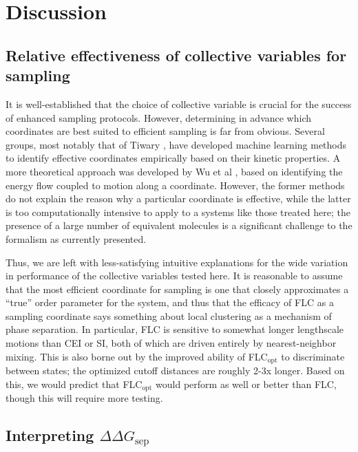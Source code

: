 \documentclass{biophys-new}
\begin{document}
\section*{Discussion}

\subsection*{Relative effectiveness of collective variables for sampling}

It is well-established that the choice of collective variable is crucial for the success of enhanced sampling protocols\cite{Valsson2016, Yang2019b, Henin2022}. However, determining in advance which coordinates are best suited to efficient sampling is far from obvious. Several groups, most notably that of Tiwary \cite{Berne2016,Berne2017,Tiwary2018b,Tiwary2021}, have developed machine learning methods to identify effective coordinates empirically based on their kinetic properties.  A more theoretical approach was developed by Wu et al \cite{Wu2022}, based on identifying the energy flow coupled to motion along a coordinate.  However, the former methods do not explain the reason why a particular coordinate is effective, while the latter is too computationally intensive to apply to a systems like those treated here; the presence of a large number of equivalent molecules is a significant challenge to the formalism as currently presented. 

Thus, we are left with less-satisfying intuitive explanations for the wide variation in performance of the collective variables tested here.  It is reasonable to assume that the most efficient coordinate for sampling is one that closely approximates a ``true'' order parameter for the system, and thus that the efficacy of FLC as a sampling coordinate says something about local clustering as a mechanism of phase separation.  In particular, FLC is sensitive to somewhat longer lengthscale motions than CEI or SI, both of which are driven entirely by nearest-neighbor mixing. This is also borne out by the improved ability of FLC$_{\text{opt}}$ to discriminate between states; the optimized cutoff distances are roughly 2-3x longer.  Based on this, we would predict that FLC$_\mathrm{opt}$ would perform as well or better than FLC, though this will require more testing. 

\subsection*{Interpreting $\Delta \Delta G_{\text{sep}}$}
\end{document}
